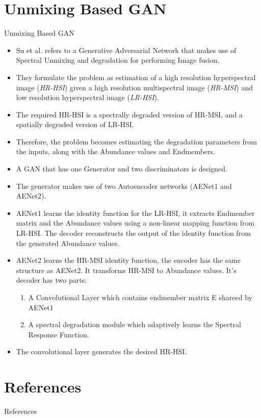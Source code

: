\documentclass{beamer}
\begin{document}
\section{Unmixing Based GAN}
\begin{frame}[allowframebreaks]{Unmixing Based GAN}
    \begin{itemize}
        \item Su et al. \cite{Su2023} refers to a Generative Adversarial Network that makes use of Spectral Unmixing and degradation for performing Image fusion.
        \item They formulate the problem as estimation of a high resolution hyperspectral image (\textit{HR-HSI}) given a high resolution multispectral image (\textit{HR-MSI}) and low resolution hyperspectral image (\textit{LR-HSI}).
        \item The required HR-HSI is a spectrally degraded version of HR-MSI, and a spatially degraded version of LR-HSI.
        \item Therefore, the problem becomes estimating the degradation parameters from the inputs, along with the Abundance values and Endmembers.
        \item A GAN that has one Generator and two discriminators is designed.
        \item The generator makes use of two Autoencoder networks (AENet1 and AENet2).
        \item AENet1 learns the identity function for the LR-HSI, it extracts Endmember matrix and the Abundance values using a non-linear mapping function from LR-HSI. The decoder reconstructs the output of the identity function from the generated Abundance values.
        \item AENet2 learns the HR-MSI identity function, the encoder has the same structure as AENet2. It transforms HR-MSI to Abundance values. It's decoder has two parts:
        \begin{enumerate}
            \item A Convolutional Layer which contains endmember matrix E shareed by AENet1
            \item A spectral degradation module which adaptively learns the Spectral Response Function.
        \end{enumerate}
        \item The convolutional layer generates the desired HR-HSI.
    \end{itemize}
\end{frame}
\section{References}
\begin{frame}[allowframebreaks]{References}
        \printbibliography
\end{frame}
\end{document}
